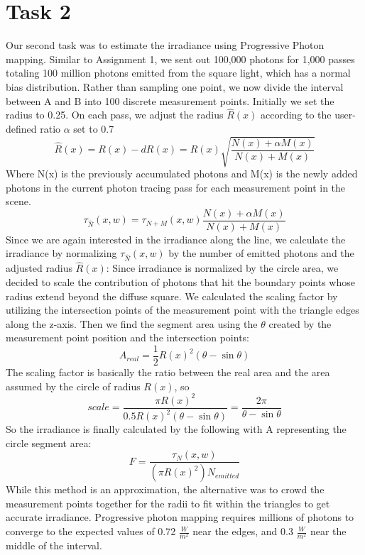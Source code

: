 \section*{Task 2}
Our second task was to estimate the irradiance using Progressive Photon mapping. Similar to Assignment 1, we sent out 100,000 photons for 1,000 passes totaling 100 million photons emitted from the square light, which has a normal bias distribution. Rather than sampling one point, we now divide the interval between A and B into 100 discrete measurement points. Initially we set the radius to 0.25. On each pass, we adjust the radius $ \hat{R}(x) $ according to the user-defined ratio $ \alpha $ set to 0.7
$$ \hat{R}(x) = R(x) - dR(x) = R(x)\sqrt{\frac{N(x)+\alpha M(x)}{N(x)+M(x)}} $$
Where N(x) is the previously accumulated photons and M(x) is the newly added photons in the current photon tracing pass for each measurement point in the scene.
$$ \tau_{\hat{N}}(x, w) = \tau_{N+M}(x, w)\frac{N(x) + \alpha M(x)}{N(x) + M(x)} $$
Since we are again interested in the irradiance along the line, we calculate the irradiance by normalizing $ \tau_{\hat{N}}(x, w) $ by the number of emitted photons and the adjusted radius  $ \hat{R}(x)$:
Since irradiance is normalized by the circle area, we decided to scale the contribution of photons that hit the boundary points whose radius extend beyond the diffuse square. We calculated the scaling factor by utilizing the intersection points of the measurement point with the triangle edges along the z-axis. Then we find the segment area using the $\theta$ created by the measurement point position and the intersection points:
$$ A_{real} = \frac{1}{2} R(x)^2 (\theta - \sin{\theta}) $$
The scaling factor is basically the ratio between the real area and the area assumed by the circle of radius $R(x)$, so
$$scale = \frac{\pi R(x)^2}{0.5 R(x)^2 (\theta - \sin{\theta})} = \frac{2\pi}{\theta - \sin{\theta}}$$
So the irradiance is finally calculated by the following with A representing the circle segment area:
$$ F = \frac{\tau_{N}(x, w)}{(\pi R(x)^2) N_{emitted}} $$
While this method is an approximation, the alternative was to crowd the measurement points together for the radii to fit within the triangles to get accurate irradiance. 
Progressive photon mapping requires millions of photons to converge to the expected values of  0.72 $ \frac{W}{m^2} $ near the edges, and 0.3 $ \frac{W}{m^2} $ near the middle of the interval.

